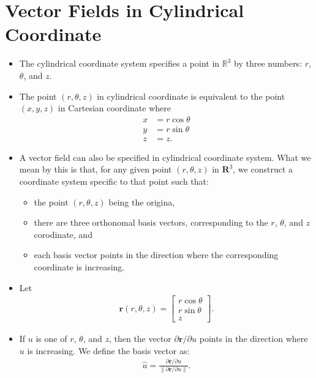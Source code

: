 \documentclass[10pt]{article}
\newcommand{\ve}[1]{\mathbf{#1}}
\begin{document}
  \section{Vector Fields in Cylindrical Coordinate}
  \begin{itemize}
    \item The cylindrical coordinate system specifies a point in $\mathbb{R}^3$ by three numbers: $r$, $\theta$, and $z$. 

    \item The point $(r, \theta, z)$ in cylindrical coordinate is equivalent to the point $(x,y,z)$ in Cartesian coordinate where
    \begin{align*}
      x &= r \cos \theta \\
      y &= r \sin \theta \\
      z &= z.
    \end{align*}

    \item A vector field can also be specified in cylindrical coordinate system. What we mean by this is that, for any given point $(r, \theta, z)$ in $\ve{R}^3$, we construct a coordinate system specific to that point such that:
    \begin{itemize}
      \item the point $(r,\theta,z)$ being the origina,
      \item there are three orthonomal basis vectors, corresponding to the $r$, $\theta$, and $z$ corodinate, and
      \item each basis vector points in the direction where the corresponding coordinate is increasing.
    \end{itemize}

    \item Let
    \begin{align*}
      \ve{r}(r, \theta, z) = \begin{bmatrix}
        r \cos \theta \\
        r \sin \theta \\
        z
      \end{bmatrix}.
    \end{align*}
    
    \item If $u$ is one of $r$, $\theta$, and $z$, then the vector $\partial \ve{r} / \partial u$ points in the direction where $u$ is increasing. We define the basis vector as:    
    \begin{align*}
      \hat{u} = \frac{\partial \ve{r} / \partial u}{\| \partial \ve{r} / \partial u \|}.
    \end{align*}


\end{itemize}
\end{document}
